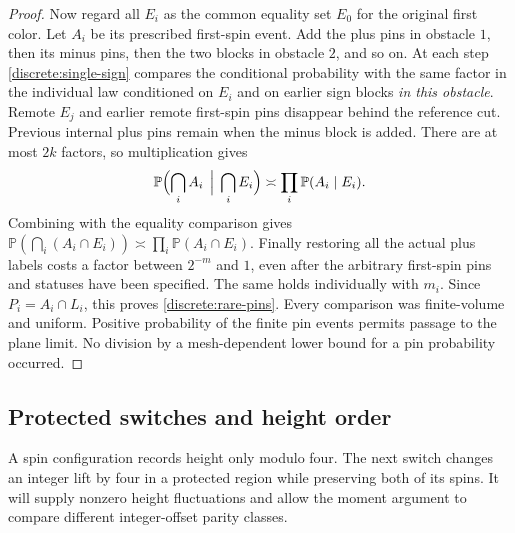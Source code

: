 \documentclass[11pt]{article}
\theoremstyle{definition}
\theoremstyle{remark}
\numberwithin{equation}{section}
\begin{document}
\begin{proof}
Now regard all $E_i$ as the common equality set $E_0$ for the original
first color. Let $A_i$ be its prescribed first-spin event. Add the plus
pins in obstacle $1$, then its minus pins, then the two blocks in obstacle
$2$, and so on. At each step \eqref{discrete:single-sign} compares the
conditional probability with the same factor in the individual law
conditioned on $E_i$ and on earlier sign blocks \emph{in this obstacle}.
Remote $E_j$ and earlier remote first-spin pins disappear behind the
reference cut. Previous internal plus pins remain when the minus block
is added. There are at most $2k$ factors, so multiplication gives
\[
 \mathbb P\Bigl(\bigcap_i A_i\,\Bigm|\,\bigcap_i E_i\Bigr)
       \asymp\prod_i\mathbb P(A_i\mid E_i).
\]
Combining with the equality comparison gives
$\mathbb P(\bigcap_i(A_i\cap E_i))\asymp
\prod_i\mathbb P(A_i\cap E_i)$. Finally restoring all the actual plus
labels costs a factor between $2^{-m}$ and $1$, even after the arbitrary
first-spin pins and statuses have been specified. The same holds
individually with $m_i$. Since $P_i=A_i\cap L_i$, this proves
\eqref{discrete:rare-pins}. Every comparison was finite-volume and
uniform. Positive probability of the finite pin events permits passage
to the plane limit. No division by a mesh-dependent lower bound for a
pin probability occurred.
\end{proof}

\subsection{Protected switches and height order}

A spin configuration records height only modulo four.  The next switch
changes an integer lift by four in a protected region while preserving
both of its spins.  It will supply nonzero height fluctuations and allow
the moment argument to compare different integer-offset parity classes.
\end{document}

